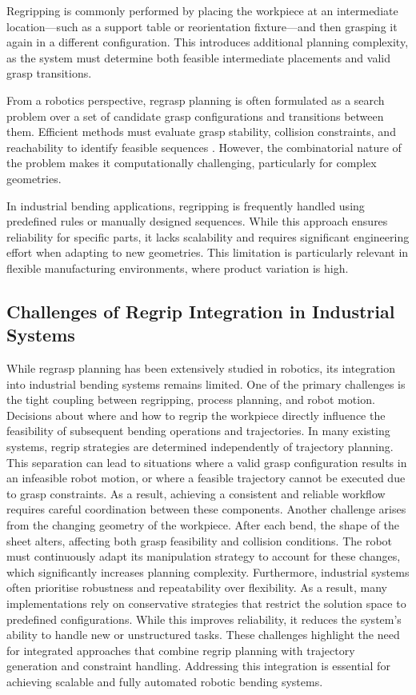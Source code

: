 Regripping is commonly performed by placing the workpiece at an intermediate location—such as a support table or reorientation fixture—and then grasping it again in a different configuration. This introduces additional planning complexity, as the system must determine both feasible intermediate placements and valid grasp transitions.
 
From a robotics perspective, regrasp planning is often formulated as a search problem over a set of candidate grasp configurations and transitions between them. Efficient methods must evaluate grasp stability, collision constraints, and reachability to identify feasible sequences \cite{wan2017regrasp}. However, the combinatorial nature of the problem makes it computationally challenging, particularly for complex geometries.
 
In industrial bending applications, regripping is frequently handled using predefined rules or manually designed sequences. While this approach ensures reliability for specific parts, it lacks scalability and requires significant engineering effort when adapting to new geometries. This limitation is particularly relevant in flexible manufacturing environments, where product variation is high.
 
\subsection{Challenges of Regrip Integration in Industrial Systems}
While regrasp planning has been extensively studied in robotics, its integration into industrial bending systems remains limited. One of the primary challenges is the tight coupling between regripping, process planning, and robot motion. Decisions about where and how to regrip the workpiece directly influence the feasibility of subsequent bending operations and trajectories.
In many existing systems, regrip strategies are determined independently of trajectory planning. This separation can lead to situations where a valid grasp configuration results in an infeasible robot motion, or where a feasible trajectory cannot be executed due to grasp constraints. As a result, achieving a consistent and reliable workflow requires careful coordination between these components.
Another challenge arises from the changing geometry of the workpiece. After each bend, the shape of the sheet alters, affecting both grasp feasibility and collision conditions. The robot must continuously adapt its manipulation strategy to account for these changes, which significantly increases planning complexity.
Furthermore, industrial systems often prioritise robustness and repeatability over flexibility. As a result, many implementations rely on conservative strategies that restrict the solution space to predefined configurations. While this improves reliability, it reduces the system’s ability to handle new or unstructured tasks.
These challenges highlight the need for integrated approaches that combine regrip planning with trajectory generation and constraint handling. Addressing this integration is essential for achieving scalable and fully automated robotic bending systems.

